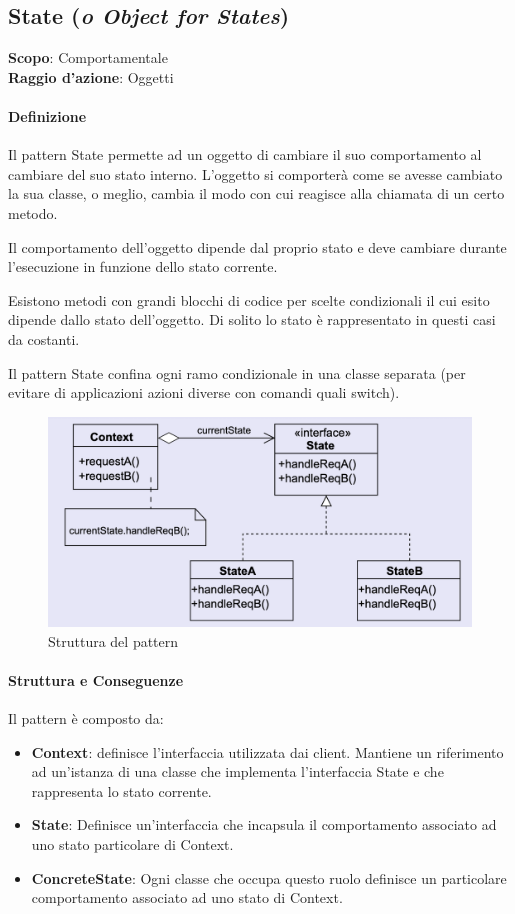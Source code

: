 \subsection{State (\textit{o Object for States})}
\label{state}

\textbf{Scopo}: Comportamentale \\
\textbf{Raggio d'azione}: Oggetti

\paragraph{Definizione} Il pattern State permette ad un oggetto di cambiare il suo comportamento al cambiare del suo stato interno. L'oggetto si comporterà come se avesse cambiato la sua classe, o meglio, cambia il modo con cui reagisce alla chiamata di un certo metodo.

Il comportamento dell'oggetto dipende dal proprio stato e deve cambiare durante l'esecuzione in funzione dello stato corrente.

Esistono metodi con grandi blocchi di codice per scelte condizionali il cui esito dipende dallo stato dell’oggetto. Di solito lo stato è rappresentato in questi casi da costanti. 

Il pattern State confina ogni ramo condizionale in una classe separata (per evitare di applicazioni azioni diverse con comandi quali switch).

\begin{figure}[H]
    \centering
    \includegraphics[width=1\linewidth]{assets/pattern/state/state-struttura.png}
    \caption{Struttura del pattern}
\end{figure}

\paragraph{Struttura e Conseguenze} Il pattern è composto da:
\begin{itemize}
    \item \textbf{Context}: definisce l’interfaccia utilizzata dai client. Mantiene un riferimento ad un’istanza di una classe che implementa l’interfaccia State e che rappresenta lo stato corrente. 
    \item \textbf{State}: Definisce un’interfaccia che incapsula il comportamento associato ad uno stato particolare di Context. 
    \item \textbf{ConcreteState}: Ogni classe che occupa questo ruolo definisce un particolare comportamento associato ad uno stato di Context.
\end{itemize}

